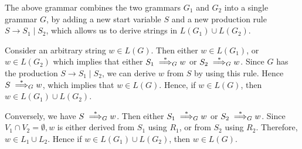 \documentclass[a4paper]{exam}
\begin{document}
\begin{questions}
\begin{solution}
	The above grammar combines the two grammars $ G_1 $ and $ G_2 $ into a single grammar $ G $, by adding a new start variable $ S $ and a new production rule $ S \rightarrow S_1 \mid S_2 $, which allows us to derive strings in $ L(G_1) \cup L(G_2) $.

	Consider an arbitrary string $w \in L(G)$. Then either $ w \in L(G_1) $, or $ w \in L(G_2) $ which implies that either $ S_1 \overset{*}{\implies}_{\hspace*{-1mm}G} w $ or $ S_2 \overset{*}{\implies}_{\hspace*{-1mm}G} w$. Since $G$ has the production $ S \rightarrow S_1 \mid S_2 $, we can derive $ w $ from $ S $ by using this rule. Hence $ S \overset{*}{\implies}_{\hspace*{-1mm}G} w $, which implies that $ w \in L(G) $. Hence, if $ w \in L(G) $, then $ w \in L(G_1) \cup L(G_2) $.

	Conversely, we have $ S \overset{*}{\implies}_{\hspace*{-1mm}G} w $. Then either $ S_1 \overset{*}{\implies}_{\hspace*{-1mm}G} w $ or $ S_2 \overset{*}{\implies}_{\hspace*{-1mm}G} w $. Since $ V_1 \cap V_2 = \emptyset, w $ is either derived from $S_1$ using $R_1$, or from $S_2$ using $R_2$. Therefore, $ w \in L_1 \cup L_2 $. Hence if $ w \in L(G_1) \cup L(G_2) $, then $ w \in L(G) $.



\end{solution}
\end{questions}
\end{document}
